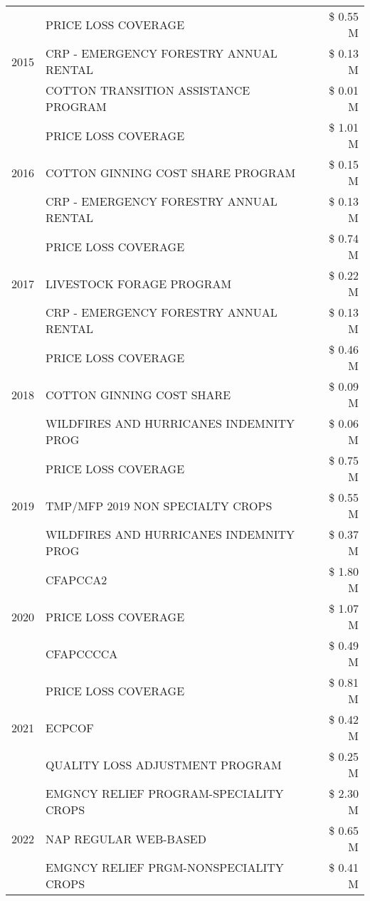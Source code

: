 \begin{tabular}{llr}
\cline{1-3}
\multirow[t]{3}{*}{2015} & PRICE LOSS COVERAGE & \$ 0.55 M \\
 & CRP - EMERGENCY FORESTRY ANNUAL RENTAL & \$ 0.13 M \\
 & COTTON TRANSITION ASSISTANCE PROGRAM & \$ 0.01 M \\
\cline{1-3}
\multirow[t]{3}{*}{2016} & PRICE LOSS COVERAGE & \$ 1.01 M \\
 & COTTON GINNING COST SHARE PROGRAM & \$ 0.15 M \\
 & CRP - EMERGENCY FORESTRY ANNUAL RENTAL & \$ 0.13 M \\
\cline{1-3}
\multirow[t]{3}{*}{2017} & PRICE LOSS COVERAGE & \$ 0.74 M \\
 & LIVESTOCK FORAGE PROGRAM & \$ 0.22 M \\
 & CRP - EMERGENCY FORESTRY ANNUAL RENTAL & \$ 0.13 M \\
\cline{1-3}
\multirow[t]{3}{*}{2018} & PRICE LOSS COVERAGE & \$ 0.46 M \\
 & COTTON GINNING COST SHARE & \$ 0.09 M \\
 & WILDFIRES AND HURRICANES INDEMNITY PROG & \$ 0.06 M \\
\cline{1-3}
\multirow[t]{3}{*}{2019} & PRICE LOSS COVERAGE & \$ 0.75 M \\
 & TMP/MFP 2019 NON SPECIALTY CROPS & \$ 0.55 M \\
 & WILDFIRES AND HURRICANES INDEMNITY PROG & \$ 0.37 M \\
\cline{1-3}
\multirow[t]{3}{*}{2020} & CFAPCCA2 & \$ 1.80 M \\
 & PRICE LOSS COVERAGE & \$ 1.07 M \\
 & CFAPCCCCA & \$ 0.49 M \\
\cline{1-3}
\multirow[t]{3}{*}{2021} & PRICE LOSS COVERAGE & \$ 0.81 M \\
 & ECPCOF & \$ 0.42 M \\
 & QUALITY LOSS ADJUSTMENT PROGRAM & \$ 0.25 M \\
\cline{1-3}
\multirow[t]{3}{*}{2022} & EMGNCY RELIEF PROGRAM-SPECIALITY CROPS & \$ 2.30 M \\
 & NAP REGULAR WEB-BASED & \$ 0.65 M \\
 & EMGNCY RELIEF PRGM-NONSPECIALITY CROPS & \$ 0.41 M \\
\cline{1-3}
\bottomrule
\end{tabular}
